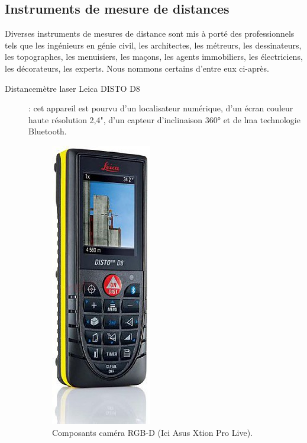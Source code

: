\documentclass[a4paper, 12pt]{book}
\begin{document}
\subsection{Instruments de mesure de distances}
Diverses instruments de mesures de distance sont mis à porté des professionnels tels que les ingénieurs en génie civil, les architectes, les métreurs, les dessinateurs, les topographes, les menuisiers, les maçons, les agents immobiliers, les électriciens, les décorateurs, les experts. Nous nommons certains d'entre eux ci-après.
\begin{description}
	\item[Distancemètre laser Leica DISTO D8]: cet appareil est pourvu d'un localisateur numérique, d'un écran couleur haute résolution 2,4", d'un capteur d'inclinaison 360° et de lma technologie Bluetooth. 
	
	\begin{figure}[htbp]
 	\begin{center}
 		\hspace{-0.75cm}
		\includegraphics[scale=0.450]{images/distancemetreLaser1.jpg} \hspace{2cm}
		\caption{Composants caméra RGB-D (Ici Asus Xtion Pro Live).\label{fig-Asus}}
  	\end{center}
\end{figure}


\end{description}
\end{document}
